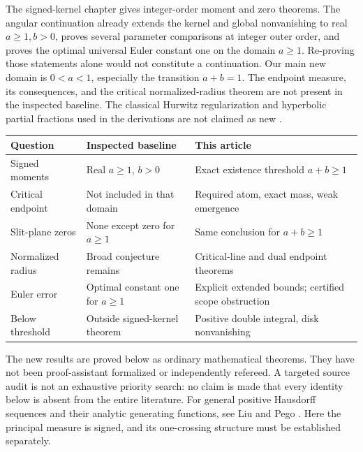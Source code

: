 \documentclass[11pt]{article}
\numberwithin{equation}{section}
\theoremstyle{definition}\newtheorem{definition}[theorem]{Definition}
\theoremstyle{remark}\newtheorem{remark}[theorem]{Remark}
\begin{document}
The signed-kernel chapter gives integer-order moment and zero theorems.
The angular continuation already extends the kernel and global
nonvanishing to real $a\ge1,b>0$, proves several parameter comparisons
at integer outer order, and proves the optimal universal Euler constant
one on the domain $a\ge1$. Re-proving those statements alone would not
constitute a continuation. Our main new domain is $0<a<1$, especially
the transition $a+b=1$. The endpoint measure, its consequences, and
the critical normalized-radius theorem are not present in the inspected
baseline. The classical Hurwitz regularization and hyperbolic partial
fractions used in the derivations are not claimed as new
\cite{dlmf-hurwitz,dlmf-hyperbolic}.

\begin{center}
\small
\begin{tabular}{@{}>{\raggedright\arraybackslash}p{}>{\raggedright\arraybackslash}p{}>{\raggedright\arraybackslash}p{}@{}}
\toprule
Question & Inspected baseline & This article\\
\midrule
Signed moments & Real $a\ge1$, $b>0$ & Exact existence threshold $a+b\ge1$\\[3pt]
Critical endpoint & Not included in that domain & Required atom, exact mass, weak emergence\\[3pt]
Slit-plane zeros & None except zero for $a\ge1$ & Same conclusion for $a+b\ge1$\\[3pt]
Normalized radius & Broad conjecture remains & Critical-line and dual endpoint theorems\\[3pt]
Euler error & Optimal constant one for $a\ge1$ & Explicit extended bounds; certified scope obstruction\\[3pt]
Below threshold & Outside signed-kernel theorem & Positive double integral, disk nonvanishing\\
\bottomrule
\end{tabular}
\end{center}

The new results are proved below as ordinary mathematical theorems.
They have not been proof-assistant formalized or independently refereed.
A targeted source audit is not an exhaustive priority search: no claim
is made that every identity below is absent from the entire literature.
For general positive Hausdorff sequences and their analytic generating
functions, see Liu and Pego \cite{liu-pego}. Here the principal measure
is signed, and its one-crossing structure must be established separately.
\end{document}
